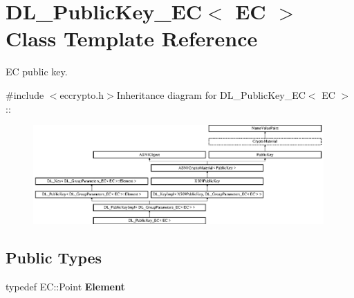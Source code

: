 \hypertarget{class_d_l___public_key___e_c}{
\section{DL\_\-PublicKey\_\-EC$<$ EC $>$ Class Template Reference}
\label{class_d_l___public_key___e_c}
}


EC public key.  


{\ttfamily \#include $<$eccrypto.h$>$}Inheritance diagram for DL\_\-PublicKey\_\-EC$<$ EC $>$::\begin{figure}[H]
\begin{center}
\leavevmode
\includegraphics[height=3.79019cm]{class_d_l___public_key___e_c}
\end{center}
\end{figure}
\subsection*{Public Types}
\begin{DoxyCompactItemize}
\item 
\hypertarget{class_d_l___public_key___e_c_a3477cdcee6c742ae06fa1a5b899bf13d}{
typedef EC::Point {\bfseries Element}}
\label{class_d_l___public_key___e_c_a3477cdcee6c742ae06fa1a5b899bf13d}

\end{DoxyCompactItemize}
